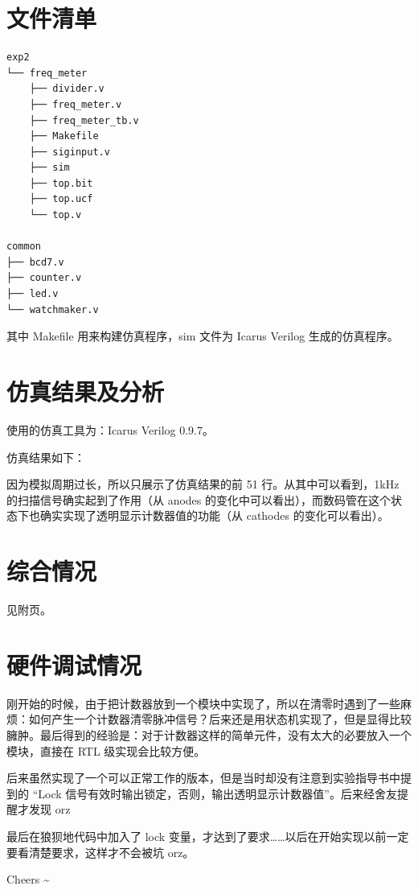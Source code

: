 \documentclass[11pt,a4paper]{article}
\begin{document}
\section{文件清单}

\begin{Verbatim}[fontsize=\scriptsize]
exp2
└── freq_meter
    ├── divider.v
    ├── freq_meter.v
    ├── freq_meter_tb.v
    ├── Makefile
    ├── siginput.v
    ├── sim
    ├── top.bit
    ├── top.ucf
    └── top.v

common
├── bcd7.v
├── counter.v
├── led.v
└── watchmaker.v
\end{Verbatim}

其中 Makefile 用来构建仿真程序，sim 文件为 Icarus Verilog 生成的仿真程序。


\section{仿真结果及分析}
使用的仿真工具为：Icarus Verilog 0.9.7。

仿真结果如下：


因为模拟周期过长，所以只展示了仿真结果的前 51 行。从其中可以看到，1kHz 的扫描信号确实起到了作用（从 anodes 的变化中可以看出），而数码管在这个状态下也确实实现了透明显示计数器值的功能（从 cathodes 的变化可以看出）。

\section{综合情况}
见附页。

\section{硬件调试情况}

刚开始的时候，由于把计数器放到一个模块中实现了，所以在清零时遇到了一些麻烦：如何产生一个计数器清零脉冲信号？后来还是用状态机实现了，但是显得比较臃肿。最后得到的经验是：对于计数器这样的简单元件，没有太大的必要放入一个模块，直接在 RTL 级实现会比较方便。

后来虽然实现了一个可以正常工作的版本，但是当时却没有注意到实验指导书中提到的 “Lock 信号有效时输出锁定，否则，输出透明显示计数器值”。后来经舍友提醒才发现 orz

最后在狼狈地代码中加入了 lock 变量，才达到了要求……以后在开始实现以前一定要看清楚要求，这样才不会被坑 orz。

Cheers \textasciitilde


\end{document}
